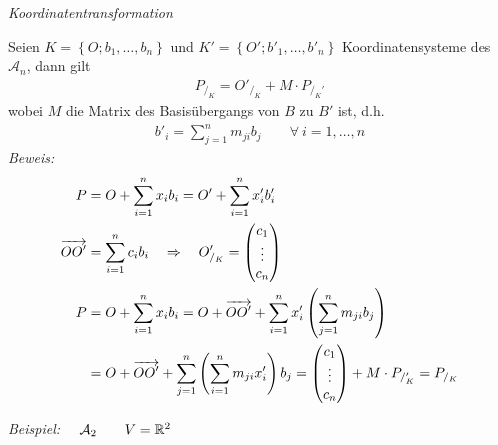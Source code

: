 \begin{mysatz}\textit{Koordinatentransformation}\medskip

    Seien $K = \left\{ O; b_1, \ldots, b_n \right\}$ und $K' = \left\{ O'; b'_1, \ldots, b'_n \right\}$ Koordinatensysteme des $\mathcal{A}_n$, dann gilt
    \begin{align*}
        P_{/_K} = O'_{/_K} + M \cdot P_{/_K'}
    \end{align*}
    wobei $M$ die Matrix des Basisübergangs von $B$ zu $B'$ ist, d.h.
    \begin{align*}
        b'_i = \sum\limits_{j=1}^{n} m_{ji} b_{j} \qquad \forall\ i = 1, \ldots, n
    \end{align*}
    \textit{Beweis:}
    \begin{align*}
        P & = O + \sum\limits_{i=1}^{n} x_i b_i = O' + \sum\limits_{i=1}^{n} x'_i b'_i\\
        \overrightarrow{OO'} & = \sum\limits_{i=1}^{n} c_i b_i \quad \Rightarrow \quad O'_{/_K} =
        \begin{pmatrix}
            c_1\\ \vdots\\ c_n
        \end{pmatrix}\\
        P & = O + \sum\limits_{i = 1}^{n} x_i b_i = O + \overrightarrow{OO'} + \sum\limits_{i=1}^{n} x'_i \left( \sum\limits_{j=1}^{n} m_{ji} b_{j} \right)\\
        & = O + \overrightarrow{OO'} + \sum\limits_{j=1}^{n} \left( \sum\limits_{i=1}^{n} m_{ji} x'_i \right) b_j =
        \begin{pmatrix}
            c_1\\ \vdots\\ c_n
        \end{pmatrix}
        + M \cdot P_{/_K'} = P_{/_K}
    \end{align*}
\end{mysatz}

\textit{Beispiel:} $\quad \mathcal{A}_2 \qquad V = \mathbb{R}^2$\medskip

